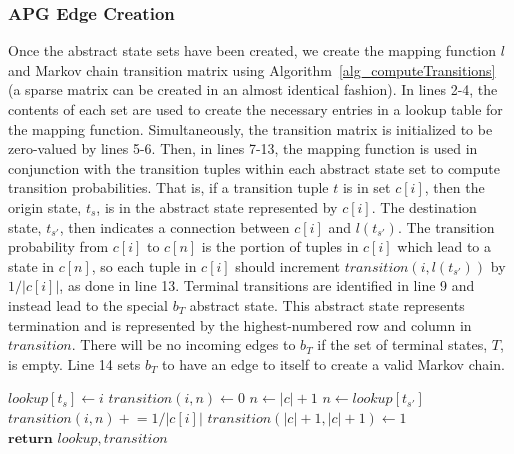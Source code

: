 \documentclass[letterpaper]{article} %
\newcommand{\pluseq}{\mathrel{+}=}
\begin{document}
\subsubsection{APG Edge Creation}
Once the abstract state sets have been created, we create the mapping function $l$ and Markov chain transition matrix using Algorithm~\ref{alg_computeTransitions} (a sparse matrix can be created in an almost identical fashion). In lines 2-4, the contents of each set are used to create the necessary entries in a lookup table for the mapping function. Simultaneously, the transition matrix is initialized to be zero-valued by lines 5-6. Then, in lines 7-13, the mapping function is used in conjunction with the transition tuples within each abstract state set to compute transition probabilities. That is, if a transition  tuple $t$ is in set $c[i]$, then the origin state, $t_s$, is in the abstract state represented by $c[i]$. The destination state, $t_{s'}$, then indicates a connection between $c[i]$ and $l(t_{s'})$. The transition probability from $c[i]$ to $c[n]$ is the portion of tuples in $c[i]$ which lead to a state in $c[n]$, so each tuple in $c[i]$ should increment $transition(i, l(t_{s'}))$ by $1 / |c[i]|$, as done in line 13.
Terminal transitions are identified in line 9 and instead lead to the special $b_T$ abstract state. This abstract state represents termination and is represented by the highest-numbered row and column in $transition$. There will be no incoming edges to $b_T$ if the set of terminal states, $T$, is empty. Line 14 sets $b_T$ to have an edge to itself to create a valid Markov chain.

\begin{algorithm}[t]
\caption{Create mapping function and transition matrix based on policy graph.} \label{alg_computeTransitions}
\begin{algorithmic}[1]
         \State $lookup[t_s] \leftarrow i$ 
      \EndFor
       
        \State $transition(i, n) \leftarrow 0$
      \EndFor
    \EndFor
         
          \State $n \leftarrow |c| + 1$
        \Else {}
          \State $n \leftarrow lookup[t_{s'}]$
        \EndIf
        \State $transition(i, n) \pluseq 1 / |c[i]|$
      \EndFor
    \EndFor
    \State $transition(|c|+1, |c|+1) \leftarrow 1$ 
    \State $\textbf{return } lookup, transition$
  \EndProcedure
\end{algorithmic}
\end{algorithm}
\end{document}
